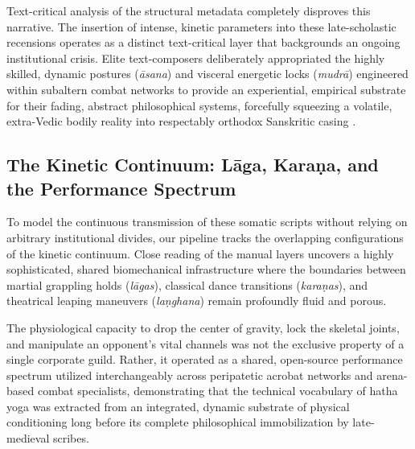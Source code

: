 \documentclass[11pt,twoside,letterpaper]{article}
\begin{document}
Text-critical analysis of the structural metadata completely disproves this narrative. The insertion of intense, kinetic parameters into these late-scholastic recensions operates as a distinct text-critical layer that backgrounds an ongoing institutional crisis. Elite text-composers deliberately appropriated the highly skilled, dynamic postures (\textit{āsana}) and visceral energetic locks (\textit{mudrā}) engineered within subaltern combat networks to provide an experiential, empirical substrate for their fading, abstract philosophical systems, forcefully squeezing a volatile, extra-Vedic bodily reality into respectably orthodox Sanskritic casing \citep{Bouy1994}.

\subsection{The Kinetic Continuum: Lāga, Karaṇa, and the Performance Spectrum}To model the continuous transmission of these somatic scripts without relying on arbitrary institutional divides, our pipeline tracks the overlapping configurations of the kinetic continuum. Close reading of the manual layers uncovers a highly sophisticated, shared biomechanical infrastructure where the boundaries between martial grappling holds (\textit{lāgas}), classical dance transitions (\textit{karaṇas}), and theatrical leaping maneuvers (\textit{laṇghana}) remain profoundly fluid and porous. 

The physiological capacity to drop the center of gravity, lock the skeletal joints, and manipulate an opponent's vital channels was not the exclusive property of a single corporate guild. Rather, it operated as a shared, open-source performance spectrum utilized interchangeably across peripatetic acrobat networks and arena-based combat specialists, demonstrating that the technical vocabulary of hatha yoga was extracted from an integrated, dynamic substrate of physical conditioning long before its complete philosophical immobilization by late-medieval scribes.
\end{document}

